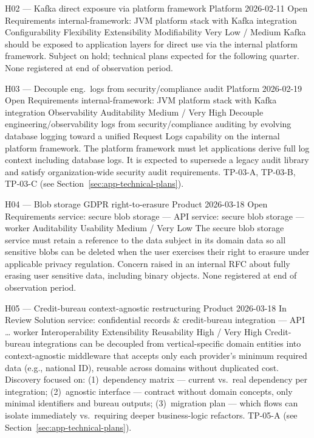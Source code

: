 \hypoboxnine%
  {H02 --- Kafka direct exposure via platform framework}%
  {Platform}%
  {2026-02-11}%
  {Open}%
  {Requirements}%
  {internal-framework: JVM platform stack with Kafka integration}%
  {Configurability \textbar{} Flexibility \textbar{} Extensibility \textbar{} Modifiability}%
  {Very Low / Medium}%
  {Kafka should be exposed to application layers for direct use via the internal
   platform framework.}%
\hypoboxtail%
  {Subject on hold; technical plans expected for the following quarter.}%
  {None registered at end of observation period.}

\hypoboxnine%
  {H03 --- Decouple eng.\ logs from security/compliance audit}%
  {Platform}%
  {2026-02-19}%
  {Open}%
  {Requirements}%
  {internal-framework: JVM platform stack with Kafka integration}%
  {Observability \textbar{} Auditability}%
  {Medium / Very High}%
  {Decouple engineering/observability logs from security/compliance auditing by
   evolving database logging toward a unified Request Logs capability on the
   internal platform framework.}%
\hypoboxtail%
  {The platform framework must let applications derive full log context including
   database logs. It is expected to supersede a legacy audit library and satisfy
   organization-wide security audit requirements.}%
  {TP-03-A, TP-03-B, TP-03-C (see Section~\ref{sec:app-technical-plans}).}

\hypoboxnine%
  {H04 --- Blob storage GDPR right-to-erasure}%
  {Product}%
  {2026-03-18}%
  {Open}%
  {Requirements}%
  {service: secure blob storage — API \textbar{} service: secure blob storage — worker}%
  {Auditability \textbar{} Usability}%
  {Medium / Very Low}%
  {The secure blob storage service must retain a reference to the data subject in
   its domain data so all sensitive blobs can be deleted when the user exercises
   their right to erasure under applicable privacy regulation.}%
\hypoboxtail%
  {Concern raised in an internal RFC about fully erasing user sensitive data,
   including binary objects.}%
  {None registered at end of observation period.}

\hypoboxnine%
  {H05 --- Credit-bureau context-agnostic restructuring}%
  {Product}%
  {2026-03-18}%
  {In Review}%
  {Solution}%
  {service: confidential records \& credit-bureau integration — API \textbar{} \ldots{} worker}%
  {Interoperability \textbar{} Extensibility \textbar{} Reusability}%
  {High / Very High}%
  {Credit-bureau integrations can be decoupled from vertical-specific domain
   entities into context-agnostic middleware that accepts only each provider's
   minimum required data (e.g., national ID), reusable across domains without
   duplicated cost.}%
\hypoboxtail%
  {Discovery focused on: (1)~dependency matrix --- current vs.\ real dependency
   per integration; (2)~agnostic interface --- contract without domain concepts,
   only minimal identifiers and bureau outputs; (3)~migration plan --- which flows
   can isolate immediately vs.\ requiring deeper business-logic refactors.}%
  {TP-05-A (see Section~\ref{sec:app-technical-plans}).}

